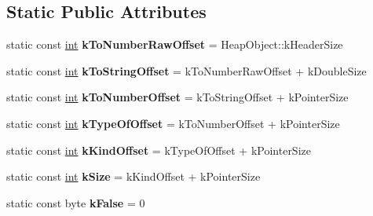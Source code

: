 \subsection*{Static Public Attributes}
\begin{DoxyCompactItemize}
\item 
\mbox{\label{classv8_1_1internal_1_1Oddball_a359c026098ad7b1d1c64b5d80e139ffd}} 
static const \mbox{\hyperlink{classint}{int}} {\bfseries k\+To\+Number\+Raw\+Offset} = Heap\+Object\+::k\+Header\+Size
\item 
\mbox{\label{classv8_1_1internal_1_1Oddball_aa6a9637c9e8da1a28f83c788c1027013}} 
static const \mbox{\hyperlink{classint}{int}} {\bfseries k\+To\+String\+Offset} = k\+To\+Number\+Raw\+Offset + k\+Double\+Size
\item 
\mbox{\label{classv8_1_1internal_1_1Oddball_a15f1533c8dc4c622d3a14c291103d5e3}} 
static const \mbox{\hyperlink{classint}{int}} {\bfseries k\+To\+Number\+Offset} = k\+To\+String\+Offset + k\+Pointer\+Size
\item 
\mbox{\label{classv8_1_1internal_1_1Oddball_a0df5c29f24ad428f01022a78853b89ce}} 
static const \mbox{\hyperlink{classint}{int}} {\bfseries k\+Type\+Of\+Offset} = k\+To\+Number\+Offset + k\+Pointer\+Size
\item 
\mbox{\label{classv8_1_1internal_1_1Oddball_a3aa86ed02d356c506c27a284e683b865}} 
static const \mbox{\hyperlink{classint}{int}} {\bfseries k\+Kind\+Offset} = k\+Type\+Of\+Offset + k\+Pointer\+Size
\item 
\mbox{\label{classv8_1_1internal_1_1Oddball_a94ef696c3fd95d44b6ace00ae799d890}} 
static const \mbox{\hyperlink{classint}{int}} {\bfseries k\+Size} = k\+Kind\+Offset + k\+Pointer\+Size
\item 
\mbox{\label{classv8_1_1internal_1_1Oddball_a3556ea40330ca7f13d1546b9a5ab278c}} 
static const byte {\bfseries k\+False} = 0
\item 
\mbox{\label{classv8_1_1internal_1_1Oddball_a7dd4be392c0689925b57abb5898c8b47}} 

\end{DoxyCompactItemize}
